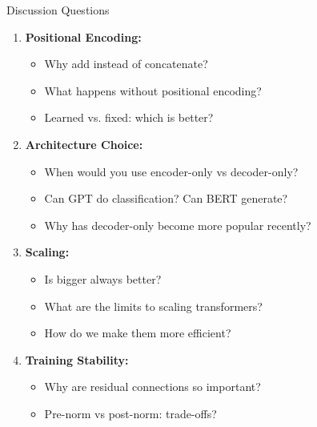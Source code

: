 \documentclass[aspectratio=169]{beamer}
\begin{document}
\begin{frame}[shrink=10]{Discussion Questions 💭}
\begin{enumerate}\setlength{\itemsep}{0pt}
    \item \textbf{Positional Encoding:}
    \begin{itemize}\setlength{\itemsep}{0pt}
        \item Why add instead of concatenate?
        \item What happens without positional encoding?
        \item Learned vs. fixed: which is better?
    \end{itemize}

    \vspace{0.5em}

    \item \textbf{Architecture Choice:}
    \begin{itemize}\setlength{\itemsep}{0pt}
        \item When would you use encoder-only vs decoder-only?
        \item Can GPT do classification? Can BERT generate?
        \item Why has decoder-only become more popular recently?
    \end{itemize}

    \vspace{0.5em}

    \item \textbf{Scaling:}
    \begin{itemize}\setlength{\itemsep}{0pt}
        \item Is bigger always better?
        \item What are the limits to scaling transformers?
        \item How do we make them more efficient?
    \end{itemize}

    \vspace{0.5em}

    \item \textbf{Training Stability:}
    \begin{itemize}\setlength{\itemsep}{0pt}
        \item Why are residual connections so important?
        \item Pre-norm vs post-norm: trade-offs?
    \end{itemize}
\end{enumerate}
\end{frame}
\end{document}
